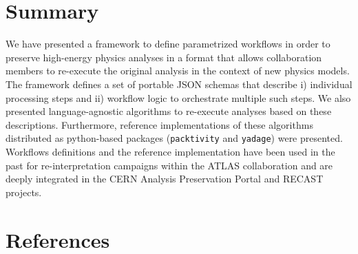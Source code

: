 \documentclass[a4paper]{jpconf}
\begin{document}
\section{Summary}

We have presented a framework to define parametrized workflows in order to preserve high-energy physics analyses in a format that allows collaboration members to re-execute the original analysis in the context of new physics models. The framework defines a set of portable JSON schemas that describe i) individual processing steps and ii) workflow logic to orchestrate multiple such steps. We also presented language-agnostic algorithms to re-execute analyses based on these descriptions. Furthermore, reference implementations of these algorithms distributed as python-based packages (\verb+packtivity+ and \verb+yadage+) were presented. Workflows definitions and the reference implementation have been used in the past for re-interpretation campaigns within the ATLAS collaboration and are deeply integrated in the CERN Analysis Preservation Portal and RECAST projects. 

\section*{References}


\end{document}
